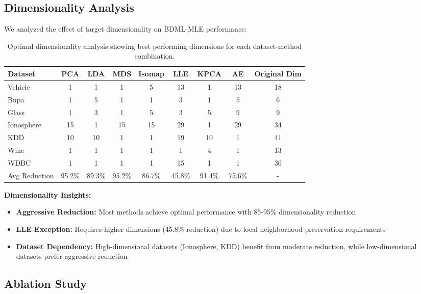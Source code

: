\documentclass[review]{elsarticle}
\begin{document}
\subsection{Dimensionality Analysis}

We analyzed the effect of target dimensionality on BDML-MLE performance:

\begin{table}[htbp]
\centering
\caption{Optimal dimensionality analysis showing best performing dimensions for each dataset-method combination.}
\label{tab:dimensionality_analysis}
\scriptsize
\begin{tabular}{l|ccccccc|c}
\toprule
Dataset & PCA & LDA & MDS & Isomap & LLE & KPCA & AE & Original Dim \\
\midrule
Vehicle & 1 & 1 & 1 & 5 & 13 & 1 & 13 & 18 \\
Bupa & 1 & 5 & 1 & 1 & 3 & 1 & 5 & 6 \\
Glass & 1 & 3 & 1 & 5 & 3 & 5 & 9 & 9 \\
Ionosphere & 15 & 1 & 15 & 15 & 29 & 1 & 29 & 34 \\
KDD & 10 & 10 & 1 & 1 & 19 & 10 & 1 & 41 \\
Wine & 1 & 1 & 1 & 1 & 1 & 4 & 1 & 13 \\
WDBC & 1 & 1 & 1 & 1 & 15 & 1 & 1 & 30 \\
\midrule
Avg Reduction & 95.2\% & 89.3\% & 95.2\% & 86.7\% & 45.8\% & 91.4\% & 75.6\% & - \\
\bottomrule
\end{tabular}
\end{table}

\textbf{Dimensionality Insights:}
\begin{itemize}
\item \textbf{Aggressive Reduction:} Most methods achieve optimal performance with 85-95\% dimensionality reduction
\item \textbf{LLE Exception:} Requires higher dimensions (45.8\% reduction) due to local neighborhood preservation requirements
\item \textbf{Dataset Dependency:} High-dimensional datasets (Ionosphere, KDD) benefit from moderate reduction, while low-dimensional datasets prefer aggressive reduction
\end{itemize}

\subsection{Ablation Study}
\end{document}
